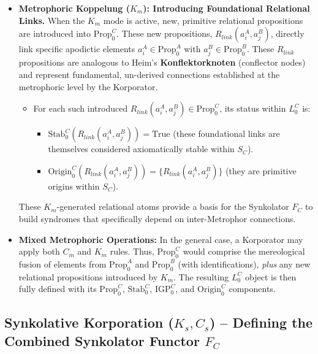 \documentclass[
    12pt,              %
    a4paper,           %
    headings=normal,   %
    twoside=true,      %
    BCOR=8mm,          %
]{scrbook}
\begin{document}
\begin{itemize}
    \item   \textbf{Metrophoric Koppelung (\(K_m\)): Introducing Foundational Relational Links.}
        When the \(K_m\) mode is active, new, primitive relational propositions are introduced into \(\text{Prop}_0^C\). These new propositions, \(R_{link}(a_i^A, a_j^B)\), directly link specific apodictic elements \(a_i^A \in \text{Prop}_0^A\) with \(a_j^B \in \text{Prop}_0^B\). These \(R_{link}\) propositions are analogous to Heim's \textbf{Konflektorknoten} (conflector nodes) and represent fundamental, un-derived connections established at the metrophoric level by the Korporator.
        \begin{itemize}
            \item   For each such introduced \(R_{link}(a_i^A, a_j^B) \in \text{Prop}_0^C\), its status within \(L_0^C\) is:
                \begin{itemize}
                    \item   \(\text{Stab}_0^C(R_{link}(a_i^A, a_j^B)) = \text{True}\) (these foundational links are themselves considered axiomatically stable within \(S_C\)).
                    \item   \(\text{Origin}_0^C(R_{link}(a_i^A, a_j^B)) = \{R_{link}(a_i^A, a_j^B)\}\) (they are primitive origins within \(S_C\)).
                \end{itemize}
        \end{itemize}
        These \(K_m\)-generated relational atoms provide a basis for the Synkolator \(F_C\) to build syndromes that specifically depend on inter-Metrophor connections.

    \item   \textbf{Mixed Metrophoric Operations:}
        In the general case, a Korporator may apply both \(C_m\) and \(K_m\) rules. Thus, \(\text{Prop}_0^C\) would comprise the mereological fusion of elements from \(\text{Prop}_0^A\) and \(\text{Prop}_0^B\) (with identifications), \textit{plus} any new relational propositions introduced by \(K_m\). The resulting \(L_0^C\) object is then fully defined with its \(\text{Prop}_0^C\), \(\text{Stab}_0^C\), \(\text{IGP}_0^C\), and \(\text{Origin}_0^C\) components.
\end{itemize}

\subsection{Synkolative Korporation (\(K_s, C_s\)) – Defining the Combined Synkolator Functor \(F_C\)}
\label{sec:ch3_modern_synkolative_korp} 
\end{document}
